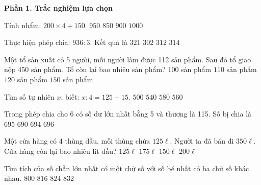 \textbf{Phần 1. Trắc nghiệm lựa chọn}

\begin{ex} %
Tính nhẩm: $200 \times 4 + 150$.
\choice
{\True $950$}
{$850$}
{$900$}
{$1000$}
\end{ex}

\begin{ex} %
Thực hiện phép chia: $936 : 3$. Kết quả là
\choice
{$321$}
{$302$}
{\True $312$}
{$314$}
\end{ex}

\begin{ex} %
Một tổ sản xuất có 5 người, mỗi người làm được 112 sản phẩm. Sau đó tổ giao nộp 450 sản phẩm. Tổ còn lại bao nhiêu sản phẩm?
\choice
{$100$ sản phẩm}
{\True $110$ sản phẩm}
{$120$ sản phẩm}
{$150$ sản phẩm}
\end{ex}

\begin{ex} %
Tìm số tự nhiên $x$, biết: $x : 4 = 125 + 15$.
\choice
{$500$}
{$540$}
{$580$}
{\True $560$}
\end{ex}

\begin{ex} %
Trong phép chia cho 6 có số dư lớn nhất bằng 5 và thương là 115. Số bị chia là
\choice
{\True $695$}
{$690$}
{$694$}
{$696$}
\end{ex}

\begin{ex} %
Một cửa hàng có 4 thùng dầu, mỗi thùng chứa $125\ell$. Người ta đã bán đi $350\ell$. Cửa hàng còn lại bao nhiêu lít dầu?
\choice
{$125\ell$}
{$175\ell$}
{\True $150\ell$}
{$200\ell$}
\end{ex}

\begin{ex} %
Tìm tích của số chẵn lớn nhất có một chữ số với số bé nhất có ba chữ số khác nhau.
\choice
{$800$}
{\True $816$}
{$824$}
{$832$}
\end{ex}

